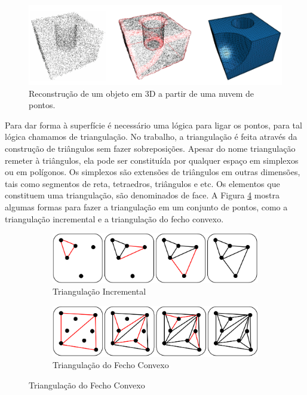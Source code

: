 \begin{figure}[H]
    \centering
    \caption{Reconstrução de um objeto em 3D a partir de uma nuvem de pontos.}
    \label{fig:reconstruction}
    \includegraphics[scale=0.8]{dados/figuras/reconstruction.png}
\end{figure}

Para dar forma à superfície é necessário uma lógica para ligar os pontos, para tal lógica chamamos de triangulação.
No trabalho, a triangulação é feita através da construção de triângulos sem fazer sobreposições. 
Apesar do nome triangulação remeter à triângulos, ela pode ser constituída por qualquer espaço em simplexos ou em polígonos. 
Os simplexos são extensões de triângulos em outras dimensões, tais como segmentos de reta, tetraedros, triângulos e etc. 
Os elementos que constituem uma triangulação, são denominados de face.
A Figura \ref{fig:triangulation} mostra algumas formas para fazer a triangulação em um conjunto de pontos, como a triangulação incremental e a triangulação do fecho convexo.

\begin{figure}[H]
    \centering
    \caption{Exemplos de modelos de triangulação.}
    \begin{subfigure}[t]{0.6\textwidth}
        \includegraphics[width=\textwidth]{dados/figuras/triangulation_incremental.png}
        \caption{Triangulação Incremental}
        \label{fig:incremental_triangulation}
    \end{subfigure}
    \hspace{5em}
    \begin{subfigure}[t]{0.6\textwidth}
        \includegraphics[width=\textwidth]{dados/figuras/triangulation_convex.png}
        \caption{Triangulação do Fecho Convexo}
        \label{fig:convex_triangulation}
    \end{subfigure}
    \label{fig:triangulation}
\end{figure}

